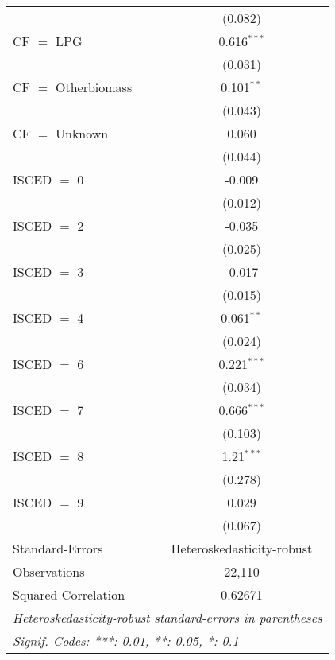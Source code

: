 \begin{table}[htbp!]
\begin{adjustbox}{width = 1\textwidth, max height = 0.95\textheight, center}
\begin{threeparttable}[b]
\begin{tabular}{lc}
                                & (0.082)\\   
            CF $=$ LPG          & 0.616$^{***}$\\   
                                & (0.031)\\   
            CF $=$ Otherbiomass & 0.101$^{**}$\\   
                                & (0.043)\\   
            CF $=$ Unknown      & 0.060\\   
                                & (0.044)\\   
            ISCED $=$ 0         & -0.009\\   
                                & (0.012)\\   
            ISCED $=$ 2         & -0.035\\   
                                & (0.025)\\   
            ISCED $=$ 3         & -0.017\\   
                                & (0.015)\\   
            ISCED $=$ 4         & 0.061$^{**}$\\   
                                & (0.024)\\   
            ISCED $=$ 6         & 0.221$^{***}$\\   
                                & (0.034)\\   
            ISCED $=$ 7         & 0.666$^{***}$\\   
                                & (0.103)\\   
            ISCED $=$ 8         & 1.21$^{***}$\\   
                                & (0.278)\\   
            ISCED $=$ 9         & 0.029\\   
                                & (0.067)\\   
            \midrule 
            Standard-Errors     & Heteroskedasticity-robust \\   
            Observations        & 22,110\\  
            Squared Correlation & 0.62671\\  
            \midrule \midrule
            \multicolumn{2}{l}{\emph{Heteroskedasticity-robust standard-errors in parentheses}}\\
            \multicolumn{2}{l}{\emph{Signif. Codes: ***: 0.01, **: 0.05, *: 0.1}}\\
         \end{tabular}
         

\end{threeparttable}
\end{adjustbox}
\end{table}
